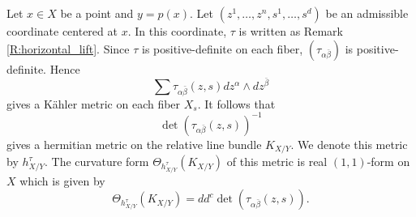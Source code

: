 \documentclass{amsart}
\theoremstyle{definition}
\numberwithin{equation}{section}
\begin{document}
Let $x\in{X}$ be a point and $y=p(x)$. Let $(z^1,\dots,z^n,s^1,\dots,s^d)$ be an admissible coordinate centered at $x$.
In this coordinate, $\tau$ is written as Remark \ref{R:horizontal_lift}. Since $\tau$ is positive-definite on each fiber, $(\tau_{\alpha\bar\beta})$ is positive-definite. Hence 
$$
\sum\tau_{\alpha\bar\beta}(z,s)dz^\alpha\wedge dz^{\bar\beta}
$$ 
gives a K\"ahler metric on each fiber $X_s$. It follows that 
\begin{equation}\label{E:metric_on_RCLB}
\det(\tau_{\alpha\bar\beta}(z,s))^{-1}
\end{equation}
gives a hermitian metric on the relative line bundle $K_{X/Y}$. We denote this metric by $h^\tau_{X/Y}$. The curvature form $\Theta_{h^\tau_{X/Y}}(K_{X/Y})$ of this metric is real $(1,1)$-form on $X$ which is given by
\begin{equation*}
\Theta_{h^\tau_{X/Y}}(K_{X/Y})
=
dd^c\det(\tau_{\alpha\bar\beta}(z,s)).
\end{equation*}
\medskip
\end{document}

